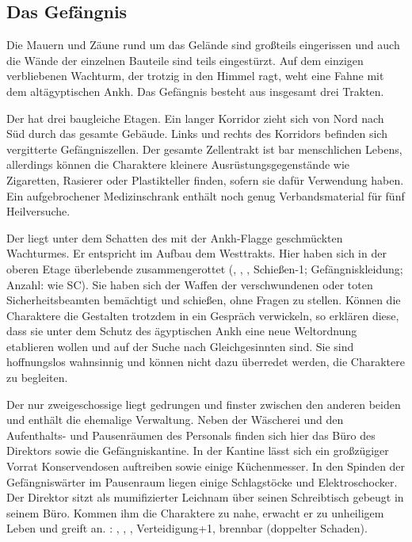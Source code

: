{		\subsection{Das Gefängnis}

		Die Mauern und Zäune rund um das Gelände sind großteils eingerissen und auch die Wände der einzelnen Bauteile sind teils eingestürzt. Auf dem einzigen verbliebenen Wachturm, der trotzig in den Himmel ragt, weht eine Fahne mit dem altägyptischen Ankh. Das Gefängnis besteht aus insgesamt drei Trakten.

		Der  hat drei baugleiche Etagen. Ein langer Korridor zieht sich von Nord nach Süd durch das gesamte Gebäude. Links und rechts des Korridors befinden sich vergitterte Gefängniszellen. Der gesamte Zellentrakt ist bar menschlichen Lebens, allerdings können die Charaktere kleinere Ausrüstungsgegenstände wie Zigaretten, Rasierer oder Plastikteller finden, sofern sie dafür Verwendung haben. Ein aufgebrochener Medizinschrank enthält noch genug Verbandsmaterial für fünf Heilversuche.

		Der  liegt unter dem Schatten des mit der Ankh-Flagge geschmückten Wachturmes. Er entspricht im Aufbau dem Westtrakts. Hier haben sich in der oberen Etage überlebende  zusammengerottet (, , , Schießen-1; Gefängniskleidung; Anzahl: wie SC). Sie haben sich der Waffen der verschwundenen oder toten Sicherheitsbeamten bemächtigt und schießen, ohne Fragen zu stellen. Können die Charaktere die Gestalten trotzdem in ein Gespräch verwickeln, so erklären diese, dass sie unter dem Schutz des ägyptischen Ankh eine neue Weltordnung etablieren wollen und auf der Suche nach Gleichgesinnten sind. Sie sind hoffnungslos wahnsinnig und können nicht dazu überredet werden, die Charaktere zu begleiten.

		Der nur zweigeschossige  liegt gedrungen und finster zwischen den anderen beiden und enthält die ehemalige Verwaltung. Neben der Wäscherei und den Aufenthalts- und Pausenräumen des Personals finden sich hier das Büro des Direktors sowie die Gefängniskantine. In der Kantine lässt sich ein großzügiger Vorrat Konservendosen auftreiben sowie einige Küchenmesser. In den Spinden der Gefängniswärter im Pausenraum liegen einige Schlagstöcke und Elektroschocker. Der Direktor sitzt als mumifizierter Leichnam über seinen Schreibtisch gebeugt in seinem Büro. Kommen ihm die Charaktere zu nahe, erwacht er zu unheiligem Leben und greift an. : , , , Verteidigung+1, brennbar (doppelter Schaden).

}
